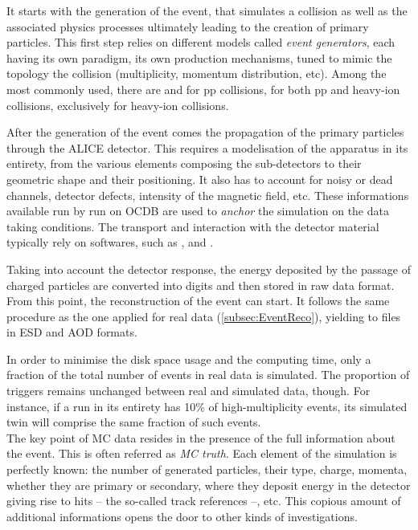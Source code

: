 It starts with the generation of the event, that simulates a collision as well as the associated physics processes ultimately leading to the creation of primary particles. This first step relies on different models called \textit{event generators}, each having its own paradigm, its own production mechanisms, tuned to mimic the topology the collision (multiplicity, momentum distribution, etc). Among the most commonly used, there are \Pythia \cite{bierlichComprehensiveGuidePhysics2022} and \Herwig \cite{bahrHerwigPhysicsManual2008} for pp collisions, \Epos \cite{pierogEPOSLHCTest2015} for both pp and heavy-ion collisions, \Hijing \cite{wangHIJINGMonteCarlo1994} exclusively for heavy-ion collisions.

After the generation of the event comes the propagation of the primary particles through the ALICE detector. This requires a modelisation of the apparatus in its entirety, from the various elements composing the sub-detectors to their geometric shape and their positioning. It also has to account for noisy or dead channels, detector defects, intensity of the magnetic field, etc. These informations available run by run on OCDB are used to \textit{anchor} the simulation on the data taking conditions. The transport and interaction with the detector material typically rely on softwares, such as \GeantThree \cite{brunGEANTUserGuide1987}, \GeantFour \cite{geant4Geant4HomePage} and \Fluka \cite{battistoniOverviewFLUKACode2015}.

Taking into account the detector response, the energy deposited by the passage of charged particles are converted into digits and then stored in raw data format. From this point, the reconstruction of the event can start. It follows the same procedure as the one applied for real data (\Sec\ref{subsec:EventReco}), yielding to files in ESD and AOD formats.

In order to minimise the disk space usage and the computing time, only a fraction of the total number of events in real data is simulated. The proportion of triggers remains unchanged between real and simulated data, though. For instance, if a run in its entirety has 10\% of high-multiplicity events, its simulated twin will comprise the same fraction of such events.\\

The key point of MC data resides in the presence of the full information about the event. This is often referred as \textit{MC truth}. Each element of the simulation is perfectly known: the number of generated particles, their type, charge, momenta, whether they are primary or secondary, where they deposit energy in the detector giving rise to hits -- the so-called track references --, etc. This copious amount of additional informations opens the door to other kinds of investigations. 

